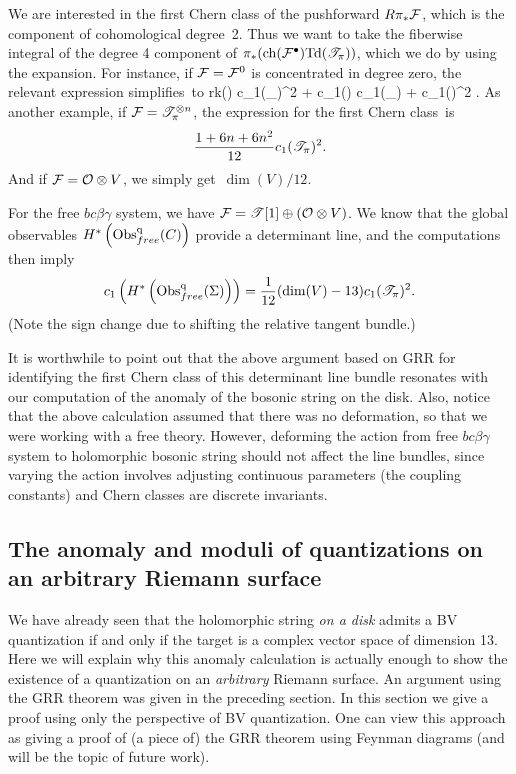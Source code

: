 We are interested in the first Chern class of the pushforward $R\pi_* \mathcal F$,
which is the component of cohomological degree~2.
Thus we want to take the fiberwise integral of the degree 4 component of $\pi_*( {\rm ch}(\mathcal F^\bullet){\rm Td}(\mathscr T_\pi))$,
which we do by using the expansion.
For instance, if $\mathcal F = \mathcal F^0$ is concentrated in degree zero, the relevant expression simplifies~to
\ben
{} {\rm rk}(\cF) c_1(\sT_\pi)^2 +  c_1(\cF) c_1(\sT_\pi) +  c_1(\cF)^2 .
\een  
As another example, if $\mathcal F = \mathscr T^{\otimes n}_{\pi}$, the expression for the first Chern class~is 
\[
\frac{1 + 6n + 6n^2}{12} c_1(\mathscr T_\pi)^2.
\]
And if $\mathcal F = \mathcal O \otimes V$, we simply get~$\dim(V)/12$. 

For the free $bc\beta\gamma$ system,
we have $\mathcal F = \mathscr T[1] \oplus (\mathcal O \otimes V)$.
We know that the global observables $H^*\left({\rm Obs}^{\rm q}_{free}(C)\right)$ provide a determinant line,
and the computations then imply
\[
c_1\left(H^*\left({\rm Obs}^{\rm q}_{free}(\Sigma)\right)\right) = \frac{1}{12} (\dim(V) - 13) c_1(\mathscr T_\pi)^2 .
\]
(Note the sign change due to shifting the relative tangent bundle.)

It is worthwhile to point out that the above argument based on GRR for identifying the first Chern class of this determinant line bundle resonates with our computation of the anomaly of the bosonic string on the disk. 
Also, notice that the above calculation assumed that there was no deformation, so that we were working with a free theory. 
However, deforming the action from free $bc\beta\gamma$ system to holomorphic bosonic string should not affect the line bundles, 
since varying the action involves adjusting continuous parameters (the coupling constants) and Chern classes are discrete invariants.

\subsection{The anomaly and moduli of quantizations on an arbitrary Riemann surface}

We have already seen that the holomorphic string {\it on a disk} admits a BV quantization if and only if the target is a complex vector space of dimension 13.
Here we will explain why this anomaly calculation is actually enough to show the existence of a quantization on an {\it arbitrary} Riemann surface. 
An argument using the GRR theorem was given in the preceding section. 
In this section we give a proof using only the perspective of BV quantization.
One can view this approach as giving a proof of (a piece of) the GRR theorem using Feynman diagrams (and will be the topic of future work). 

